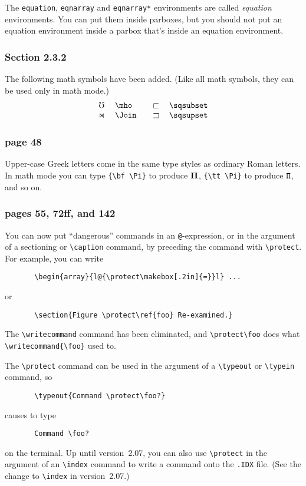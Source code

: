 The {\tt equation}, {\tt eqnarray} and \hbox{\tt eqnarray*} environments
are called {\it equation\/} environments.  You can put them inside
parboxes, but you should not put an equation environment inside a 
parbox that's inside an equation environment.

\subsubsection* {Section 2.3.2}
The following math symbols have been added.  (Like all math symbols,
they can be used only in math mode.)
\[ \begin{tabular}{ll@{\protect\hspace{20pt}}ll}
    $\mho$ & \verb|\mho| & $\sqsubset$ & \verb|\sqsubset|\\
    $\Join$ & \verb|\Join| & $\sqsupset$ & \verb|\sqsupset|
\end{tabular}
 \]

\subsubsection*{page 48}
Upper-case Greek letters come in the same type styles as ordinary
Roman letters.  In math mode you can type \hbox{\verb"{\bf \Pi}"}
to produce ${\bf \Pi}$, \hbox{\verb"{\tt \Pi}"} to produce
${\tt \Pi}$, and so on.  

\subsubsection*{pages 55, 72ff, and 142}
You can now put ``dangerous'' commands in an {\tt @}-expression, or
in the argument of a sectioning or \hbox{\verb|\caption|} command, by
preceding the command with \hbox{\verb|\protect|}.  For example, you
can write 
\begin{verbatim}
       \begin{array}{l@{\protect\makebox[.2in]{=}}l} ...
\end{verbatim}
or
\begin{verbatim}
       \section{Figure \protect\ref{foo} Re-examined.}
\end{verbatim}
The \hbox{\verb|\writecommand|} command has been eliminated, and
\hbox{\verb|\protect\foo|} does what \hbox{\verb|\writecommand{\foo}|}
used to.

The \hbox{\verb"\protect"} command can be used in the argument of a
\hbox{\verb"\typeout"} or \hbox{\verb"\typein"} command, so
\begin{verbatim}
       \typeout{Command \protect\foo?}
\end{verbatim}
causes \TEX{} to type
\begin{verbatim}
       Command \foo?
\end{verbatim}
on the terminal.  Up until version~2.07, you can also use
\hbox{\verb"\protect"} in the argument of an \hbox{\verb"\index"}
command to write a command onto the {\tt .IDX} file.  
(See the change to \hbox{\verb"\index"} in version~2.07.)

